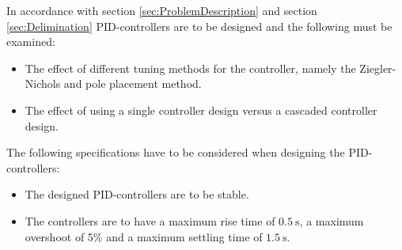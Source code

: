 \documentclass[../../main.tex]{subfiles}
\begin{document}
In accordance with section \ref{sec:ProblemDescription} and section \ref{sec:Delimination} PID-controllers are to be designed and the following must be examined:
\begin{itemize}
    \item The effect of different tuning methods for the controller, namely the Ziegler-Nichols and pole placement method.
    \item The effect of using a single controller design versus a cascaded controller design.
\end{itemize}

The following specifications have to be considered when designing the PID-controllers:
\begin{itemize}
    \item The designed PID-controllers are to be stable.
    \item The controllers are to have a maximum rise time of $\SI{0.5}{\second}$, a maximum overshoot of 5\% and a maximum settling time of $\SI{1.5}{\second}$.
\end{itemize}
\end{document}
